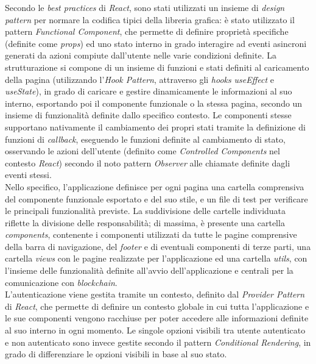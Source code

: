 Secondo le \textit{best practices} di \textit{React}, sono stati utilizzati un insieme di \textit{design pattern} per normare la codifica tipici della libreria grafica:
è stato utilizzato il pattern \textit{Functional Component}, che permette di definire proprietà specifiche (definite come \textit{props})
ed uno stato interno in grado interagire ad eventi asincroni generati da azioni compiute dall'utente nelle varie condizioni definite. La strutturazione si compone di un insieme di funzioni e stati definiti
al caricamento della pagina (utilizzando l'\textit{Hook Pattern}, attraverso gli \textit{hooks} \textit{useEffect} e \textit{useState}), in grado di caricare e gestire dinamicamente le informazioni
al suo interno, esportando poi il componente funzionale o la stessa pagina, secondo un insieme di funzionalità definite dallo specifico contesto. 
Le componenti stesse supportano nativamente il cambiamento dei propri stati tramite la definizione di funzioni di \textit{callback}, eseguendo le funzioni definite al cambiamento di stato,
osservando le azioni dell'utente (definito come \textit{Controlled Components} nel contesto \textit{React}) secondo il noto pattern \textit{Observer} alle chiamate definite dagli eventi stessi. \\

Nello specifico, l'applicazione definisce per ogni pagina una cartella comprensiva del componente funzionale
esportato e del suo stile, e un file di test per verificare le principali funzionalità previste.
La suddivisione delle cartelle individuata riflette la divisione delle responsabilità; di massima, è presente una cartella \textit{components}, contenente i componenti utilizzati da tutte le pagine 
comprensive della barra di navigazione, del \textit{footer} e di eventuali componenti di terze parti, una cartella \textit{views} con le pagine realizzate per l'applicazione ed
una cartella \textit{utils}, con l'insieme delle funzionalità definite all'avvio dell'applicazione e centrali per la comunicazione con \textit{blockchain}. \\

L'autenticazione viene gestita tramite un contesto, definito dal \textit{Provider Pattern} di \textit{React}, che permette di definire un contesto globale
in cui tutta l'applicazione e le sue componenti vengono racchiuse per poter accedere alle informazioni definite al suo interno in ogni momento.
Le singole opzioni visibili tra utente autenticato e non autenticato sono invece gestite secondo il pattern \textit{Conditional Rendering}, in grado di differenziare le opzioni
visibili in base al suo stato.

